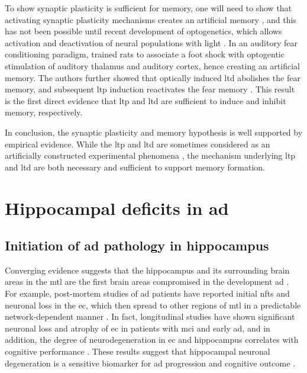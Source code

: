 To show synaptic plasticity is sufficient for memory, one will need to show that activating synaptic plasticity mechanisms creates an artificial memory \citep{neves08}, and this has not been possible until recent development of optogenetics, which allows activation and deactivation of neural populations with light  \citep{zhang07, rajasethupathy16}. In an auditory fear conditioning paradigm, \citet{nabavi14} trained rats to associate a foot shock with optogentic stimulation of auditory thalamus and auditory cortex, hence creating an artificial memory. The authors further showed that optically induced \gls{ltd} abolishes the fear memory, and subsequent \gls{ltp} induction reactivates the fear memory \citep{nabavi14}. This result is the first direct evidence that \gls{ltp} and \gls{ltd} are sufficient to induce and inhibit memory, respectively. 

In conclusion, the synaptic plasticity and memory hypothesis is well supported by empirical evidence. While the \gls{ltp} and \gls{ltd} are sometimes considered as an artificially constructed experimental phenomena \citep{stevens98}, the mechanism underlying \gls{ltp} and \gls{ltd} are both necessary and sufficient to support memory formation.

\section{Hippocampal deficits in \gls{ad}}
\subsection{Initiation of \gls{ad} pathology in hippocampus}
Converging evidence suggests that the hippocampus and its surrounding brain areas in the \gls{mtl} are the first brain areas compromised in the development \gls{ad} \citep{palmer11, zhou16}. For example, post-mortem studies of \gls{ad} patients have reported initial \glspl{nft} and neuronal loss in the \gls{ec}, which then spread to other regions of \gls{mtl} in a predictable network-dependent manner \citep{braak91,  hoesen93, zhan09}. In fact, longitudinal studies have shown significant neuronal loss and atrophy of \gls{ec} in patients with \gls{mci} and early \gls{ad}, and in addition, the degree of neurodegeneration in \gls{ec} and hippocampus correlates with cognitive performance \citep{kordower01, jack02, pennanen04}. These results suggest that hippocampal neuronal degeneration is a sensitive biomarker for \gls{ad} progression and cognitive outcome \citep{jack02, zhou16}. 

